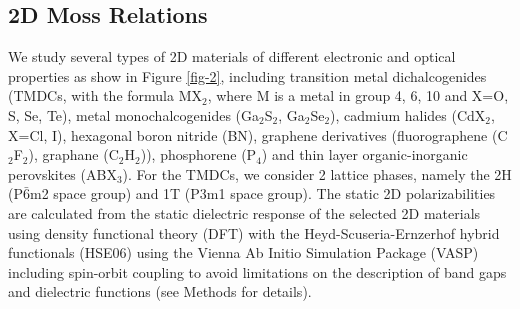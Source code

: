 \documentclass[journal=ancac3,manuscript=article,email=true,hyperref=true,keywords=false]{achemso}
\begin{document}
\subsection{2D Moss Relations}
\label{sec:first-principles}
We study several types of 2D materials of different electronic and
optical properties as show in Figure \ref{fig-2}, including transition
metal dichalcogenides (TMDCs, with the formula MX\(_{\text{2}}\),
where M is a metal in group 4, 6, 10 and X=O, S, Se, Te), metal
monochalcogenides (Ga$_{2}$S$_{2}$, Ga$_{2}$Se$_{2}$), cadmium halides
(CdX$_2$, X=Cl, I), hexagonal boron nitride (BN), graphene derivatives
(fluorographene (C$_{2}$F$_{2}$), graphane (C$_{2}$H$_{2}$)),
phosphorene (P$_{4}$) and thin layer organic-inorganic perovskites
(ABX$_{3}$).  For the TMDCs, we consider 2 lattice phases, namely the
2H (P\(\bar{6}\)m2 space group) and 1T (P3m1 space group).  The static
2D polarizabilities are calculated from the static dielectric response
of the selected 2D materials using density functional theory (DFT)
with the Heyd-Scuseria-Ernzerhof hybrid functionals (HSE06) using the
Vienna Ab Initio Simulation Package (VASP) including spin-orbit
coupling to avoid limitations on the description of band gaps and
dielectric functions (see Methods for details).
\end{document}
